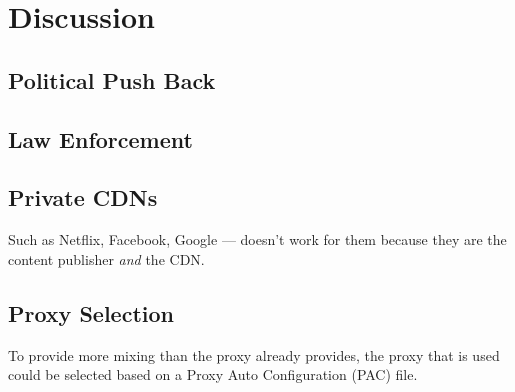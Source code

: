\section{Discussion}
\label{sec:discussion}

\subsection{Political Push Back}

\subsection{Law Enforcement}

\subsection{Private CDNs}
Such as Netflix, Facebook, Google --- \system{} doesn't work for them because they are the content publisher {\it and} the CDN.

\subsection{Proxy Selection}
To provide more mixing than the proxy already provides, 
the proxy that is used could be selected based 
on a Proxy Auto Configuration (PAC) file.
